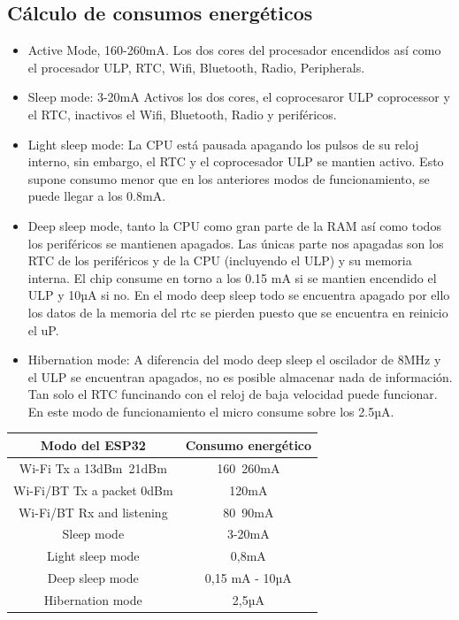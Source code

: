 \documentclass[a4paper ,12pt, onecolumn]{article}
\begin{document}
    \subsection{Cálculo de consumos energéticos}
            \begin{itemize}
                \item  Active Mode, 160-260mA.  Los dos cores del procesador encendidos así como el procesador ULP,
                RTC, Wifi, Bluetooth, Radio, Peripherals.
                \item  Sleep mode: 3-20mA Activos los dos cores, el coprocesaror ULP coprocessor y el RTC, inactivos el 
                Wifi, Bluetooth, Radio y periféricos.
                \item  Light sleep mode: La CPU está pausada apagando los pulsos de su reloj interno, sin embargo, el RTC
                y el coprocesador ULP se mantien activo. Esto supone consumo menor que en los anteriores modos de funcionamiento,
                se puede llegar a los 0.8mA.
                \item Deep sleep mode, tanto la CPU como gran parte de la RAM así como todos los periféricos se mantienen 
                apagados. Las únicas parte nos apagadas son los RTC de los periféricos y de la CPU (incluyendo el ULP) y su
                memoria interna. El chip consume en torno a los 0.15 mA si se mantien encendido el ULP y  10µA si no.
                En el modo deep sleep todo se encuentra apagado por ello los datos de la memoria del rtc se pierden
                puesto que se encuentra en reinicio el uP.
                \item Hibernation mode: A diferencia del modo deep sleep el oscilador de 8MHz y el ULP se encuentran apagados,
                no es posible almacenar nada de información. Tan solo el RTC funcinando con el reloj de baja velocidad puede funcionar.
                En este modo de funcionamiento el micro consume sobre los 2.5µA.
            \end{itemize}
            \begin{center}
                \begin{tabular}{||c || c ||} 
                \hline
                Modo del ESP32  & Consumo energético  \\ [0.5ex] 
                \hline
                Wi-Fi Tx a 13dBm~21dBm & 160~260mA  \\ 
                Wi-Fi/BT Tx  a packet 0dBm	 & 120mA  \\
                Wi-Fi/BT Rx and listening & 80~90mA  \\
                Sleep mode &  3-20mA   \\
                Light sleep mode &0,8mA  \\
                Deep sleep mode &   0,15 mA - 10µA  \\
                Hibernation mode & 2,5µA  \\
                \end{tabular}
            \end{center}
\end{document}
